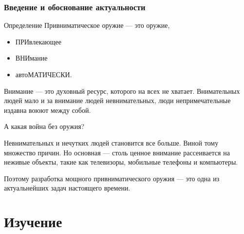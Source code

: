 \begin{frame}
    \frametitle{Введение и обоснование актуальности}
    
    \begin{block}{Определение}
        \alert{Привниматическое} оружие --- это оружие, 
        \begin{itemize}
            \item \alert{ПРИ}влекающее 
            \item \alert{ВНИ}мание 
            \item авто\alert{МАТИЧЕСКИ}.
        \end{itemize}
    \end{block}
    
    \alert{Внимание} --- это духовный ресурс, которого на всех не хватает. Внимательных людей мало и за внимание людей невнимательных, люди непримечательные издавна воюют между собой. 
    
    А какая война без оружия?
\end{frame}
    
Невнимательных и нечутких людей становится все больше. Виной тому множество причин. Но основная --- столь ценное внимание рассеивается на неживые объекты, такие как телевизоры, мобильные телефоны и компьютеры.
    
Поэтому разработка мощного привниматического оружия --- это одна из актуальнейших задач настоящего времени.

\section{Изучение}

